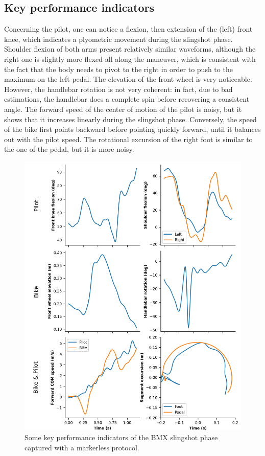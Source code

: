 \FloatBarrier
\subsection{Key performance indicators}

Concerning the pilot, one can notice a flexion, then extension of the (left) front knee, which indicates a plyometric movement during the slingshot phase. Shoulder flexion of both arms present relatively similar waveforms, although the right one is slightly more flexed all along the maneuver, which is consistent with the fact that the body needs to pivot to the right in order to push to the maximum on the left pedal. The elevation of the front wheel is very noticeable. However, the handlebar rotation is not very coherent: in fact, due to bad estimations, the handlebar does a complete spin before recovering a consistent angle. The forward speed of the center of motion of the pilot is noisy, but it shows that it increases linearly during the slingshot phase. Conversely, the speed of the bike first points backward before pointing quickly forward, until it balances out with the pilot speed. The rotational excursion of the right foot is similar to the one of the pedal, but it is more noisy. 

\begin{figure}[hbtp]
	\centering
	\def\svgwidth{1\columnwidth}
	\fontsize{10pt}{10pt}\selectfont
	\includegraphics[width=0.85\linewidth, left]{"../Chap7/Figures/KPIs_BMX.png"}
	\caption{Some key performance indicators of the BMX slingshot phase captured with a markerless protocol.}
	\label{fig_kpisbmx}
\end{figure}


